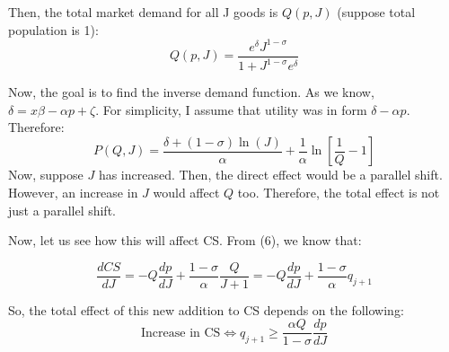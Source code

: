 \documentclass[12pt]{article}
\begin{document}
Then, the total market demand for all J goods is $Q(p,J)$ (suppose total population is 1):
\begin{equation}
    Q(p,J) = \frac{e^{\delta} J^{1 -\sigma}}{1+J^{1-\sigma}e^\delta}
\end{equation}

Now, the goal is to find the inverse demand function. As we know, $\delta = x\beta - \alpha p + \zeta$. For simplicity, I assume that utility was in form $\delta - \alpha p$. Therefore:
\begin{equation}
    P(Q,J) = \frac{\delta + (1-\sigma) \ln(J)}{\alpha} + \frac{1}{\alpha}\ln \left[\frac{1}{Q} - 1\right]
\end{equation}
Now, suppose $J$ has increased. Then, the direct effect would be a parallel shift. However, an increase in $J$ would affect $Q$ too. Therefore, the total effect is not just a parallel shift.

Now, let us see how this will affect CS. From (6), we know that:

\begin{equation}
    \frac{d CS}{d J} = - Q \frac{d p}{d J} + \frac{1-\sigma}{\alpha} \frac{Q}{J+1} = - Q \frac{d p}{d J} + \frac{1-\sigma}{\alpha} q_{j+1}
\end{equation}

So, the total effect of this new addition to CS depends on the following:
\begin{equation}
    \text{Increase in CS} \Leftrightarrow q_{j+1} \geq \frac{\alpha Q}{1-\sigma} \frac{d p}{d J}
\end{equation}
\end{document}
